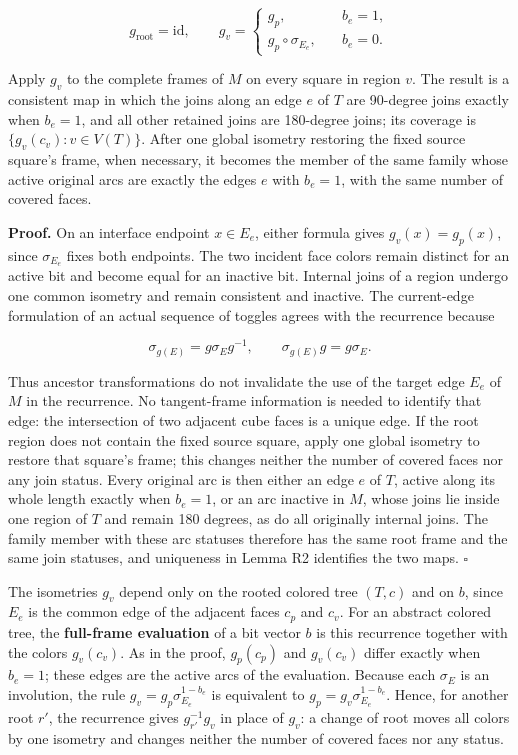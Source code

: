 \documentclass[
  11pt,
]{article}
\begin{document}
\[
g_{\mathrm{root}}=\mathrm{id},\qquad
g_v=\begin{cases}
g_p,&\quad b_e=1,\\
g_p\circ\sigma_{E_e},&\quad b_e=0.
\end{cases}
\]

Apply \(g_v\) to the complete frames of \(M\) on every square in region
\(v\). The result is a consistent map in which the joins along an edge
\(e\) of \(T\) are 90-degree joins exactly when \(b_e=1\), and all other
retained joins are 180-degree joins; its coverage is
\(\{g_v(c_v):v\in V(T)\}\). After one global isometry restoring the
fixed source square's frame, when necessary, it becomes the member of
the same family whose active original arcs are exactly the edges \(e\)
with \(b_e=1\), with the same number of covered faces.

\textbf{Proof.} On an interface endpoint \(x\in E_e\), either formula
gives \(g_v(x)=g_p(x)\), since \(\sigma_{E_e}\) fixes both endpoints.
The two incident face colors remain distinct for an active bit and
become equal for an inactive bit. Internal joins of a region undergo one
common isometry and remain consistent and inactive. The current-edge
formulation of an actual sequence of toggles agrees with the recurrence
because

\[
\sigma_{g(E)}=g\sigma_Eg^{-1},\qquad
\sigma_{g(E)}g=g\sigma_E.
\]

Thus ancestor transformations do not invalidate the use of the target
edge \(E_e\) of \(M\) in the recurrence. No tangent-frame information is
needed to identify that edge: the intersection of two adjacent cube
faces is a unique edge. If the root region does not contain the fixed
source square, apply one global isometry to restore that square's frame;
this changes neither the number of covered faces nor any join status.
Every original arc is then either an edge \(e\) of \(T\), active along
its whole length exactly when \(b_e=1\), or an arc inactive in \(M\),
whose joins lie inside one region of \(T\) and remain 180 degrees, as do
all originally internal joins. The family member with these arc statuses
therefore has the same root frame and the same join statuses, and
uniqueness in Lemma R2 identifies the two maps. \(\square\)

The isometries \(g_v\) depend only on the rooted colored tree \((T,c)\)
and on \(b\), since \(E_e\) is the common edge of the adjacent faces
\(c_p\) and \(c_v\). For an abstract colored tree, the
\textbf{full-frame evaluation} of a bit vector \(b\) is this recurrence
together with the colors \(g_v(c_v)\). As in the proof, \(g_p(c_p)\) and
\(g_v(c_v)\) differ exactly when \(b_e=1\); these edges are the active
arcs of the evaluation. Because each \(\sigma_E\) is an involution, the
rule \(g_v=g_p\sigma_{E_e}^{1-b_e}\) is equivalent to
\(g_p=g_v\sigma_{E_e}^{1-b_e}\). Hence, for another root \(r'\), the
recurrence gives \(g_{r'}^{-1}g_v\) in place of \(g_v\): a change of
root moves all colors by one isometry and changes neither the number of
covered faces nor any status.
\end{document}

